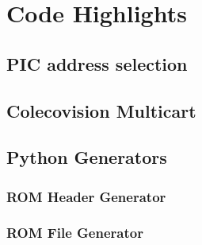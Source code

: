 \documentclass{article}
\begin{document}
  \newpage

  \section{Code Highlights}

  \subsection{PIC address selection} \label{PIC address selection}

  \subsection{Colecovision Multicart}

  \subsection{Python Generators}

  \subsubsection{ROM Header Generator}

  \subsubsection{ROM File Generator}
\end{document}
